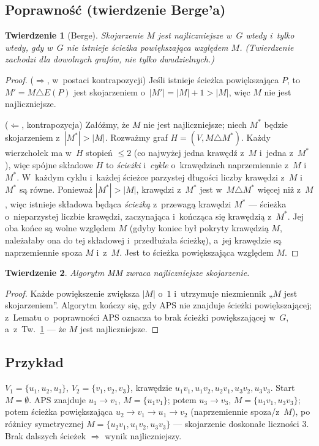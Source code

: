 \documentclass[11pt,a4paper]{article}
\theoremstyle{plain}
\newtheorem{twierdzenie}{Twierdzenie}[section]
\theoremstyle{definition}
\begin{document}
\subsection*{Poprawność (twierdzenie Berge'a)}
\begin{twierdzenie}[Berge]\label{tw:berge}
Skojarzenie $M$ jest najliczniejsze w~$G$ wtedy i~tylko wtedy, gdy w~$G$ nie istnieje ścieżka
powiększająca względem $M$. (Twierdzenie zachodzi dla dowolnych grafów, nie tylko dwudzielnych.)
\end{twierdzenie}
\begin{proof}
($\Rightarrow$, w~postaci kontrapozycji) Jeśli istnieje ścieżka powiększająca $P$, to $M'=M\triangle E(P)$
jest skojarzeniem o~$|M'|=|M|+1>|M|$, więc $M$ nie jest najliczniejsze.

($\Leftarrow$, kontrapozycja) Załóżmy, że $M$ nie jest najliczniejsze; niech $M^\ast$ będzie skojarzeniem
z~$|M^\ast|>|M|$. Rozważmy graf $H=(V,M\triangle M^\ast)$. Każdy wierzchołek ma w~$H$ stopień $\le2$ (co
najwyżej jedna krawędź z~$M$ i~jedna z~$M^\ast$), więc spójne składowe $H$ to \emph{ścieżki} i~\emph{cykle}
o~krawędziach naprzemiennie z~$M$ i~$M^\ast$. W~każdym cyklu i~każdej ścieżce parzystej długości liczby
krawędzi z~$M$ i~$M^\ast$ są równe. Ponieważ $|M^\ast|>|M|$, krawędzi z~$M^\ast$ jest w~$M\triangle M^\ast$
więcej niż z~$M$, więc istnieje składowa będąca \emph{ścieżką} z~przewagą krawędzi $M^\ast$ --- ścieżka
o~nieparzystej liczbie krawędzi, zaczynająca i~kończąca się krawędzią z~$M^\ast$. Jej oba końce są wolne
względem $M$ (gdyby koniec był pokryty krawędzią $M$, należałaby ona do tej składowej i~przedłużała
ścieżkę), a~jej krawędzie są naprzemiennie spoza $M$ i~z~$M$. Jest to ścieżka powiększająca względem $M$.
\end{proof}
\begin{twierdzenie}
Algorytm MM zwraca najliczniejsze skojarzenie.
\end{twierdzenie}
\begin{proof}
Każde powiększenie zwiększa $|M|$ o~$1$ i~utrzymuje niezmiennik „$M$ jest skojarzeniem''. Algorytm kończy
się, gdy APS nie znajduje ścieżki powiększającej; z~Lematu o~poprawności APS oznacza to brak ścieżki
powiększającej w~$G$, a~z~Tw.~\ref{tw:berge} --- że $M$ jest najliczniejsze.
\end{proof}

\subsection*{Przykład}
$V_1=\{u_1,u_2,u_3\}$, $V_2=\{v_1,v_2,v_3\}$, krawędzie
$u_1v_1,u_1v_2,u_2v_1,u_3v_2,u_3v_3$. Start $M=\emptyset$. APS znajduje $u_1\!\to\!v_1$, $M=\{u_1v_1\}$;
potem $u_3\!\to\!v_3$, $M=\{u_1v_1,u_3v_3\}$; potem ścieżka powiększająca $u_2\!\to\!v_1\!\to\!u_1\!\to\!v_2$
(naprzemiennie spoza/z~$M$), po różnicy symetrycznej $M=\{u_2v_1,u_1v_2,u_3v_3\}$ --- skojarzenie doskonałe
liczności $3$. Brak dalszych ścieżek $\Rightarrow$ wynik najliczniejszy.
\end{document}
